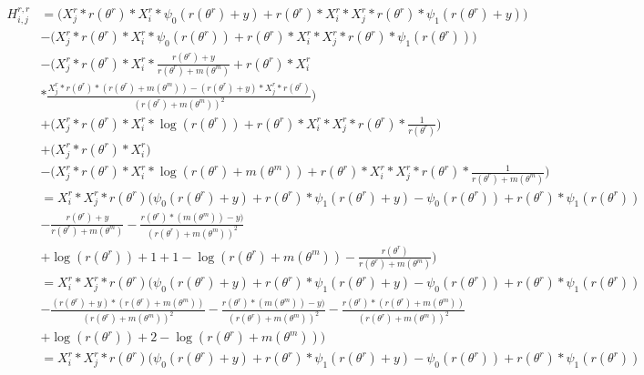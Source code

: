 \documentclass[bibliography=totoc,10pt]{scrartcl}
\begin{document}
\begin{equation}
\begin{split}
H^{r,r}_{i,j} &= \bigg( X^r_{j} * r(\theta^r) * X^r_{i} * \psi_0(r(\theta^r)+y) + r(\theta^r) * X^r_{i} * X^r_{j} * r(\theta^r) * \psi_1(r(\theta^r)+y) \bigg) \\
&- \bigg( X^r_{j} * r(\theta^r) * X^r_{i} * \psi_0(r(\theta^r)) + r(\theta^r) * X^r_{i} * X^r_{j} * r(\theta^r) * \psi_1(r(\theta^r)) \bigg) \\
&- \bigg( X^r_{j} * r(\theta^r) * X^r_{i} * \frac{r(\theta^r) + y}{r(\theta^r)+m(\theta^m)} + r(\theta^r) * X^r_{i} \\
&* \frac{X^r_{j} * r(\theta^r)*(r(\theta^r)+m(\theta^m))-(r(\theta^r) + y)*X^r_{j} * r(\theta^r)}{(r(\theta^r)+m(\theta^m))^2} \bigg) \\
&+\bigg( X^r_{j} * r(\theta^r) * X^r_{i} * \log(r(\theta^r)) + r(\theta^r) * X^r_{i} * X^r_{j} * r(\theta^r) * \frac{1}{r(\theta^r)} \bigg) \\
&+\bigg( X^r_{j} * r(\theta^r) * X^r_{i}  \bigg) \\
&- \bigg( X^r_{j} * r(\theta^r) * X^r_{i} * \log(r(\theta^r)+m(\theta^m)) +  r(\theta^r) * X^r_{i} * X^r_{j} * r(\theta^r) * \frac{1}{r(\theta^r)+m(\theta^m)} \bigg) \\
&=X^r_{i} * X^r_{j} * r(\theta^r) \bigg( \psi_0(r(\theta^r)+y) + r(\theta^r) * \psi_1(r(\theta^r)+y) - \psi_0(r(\theta^r)) + r(\theta^r) * \psi_1(r(\theta^r)) \\
&- \frac{r(\theta^r) + y}{r(\theta^r)+m(\theta^m)} - \frac{ r(\theta^r)*(m(\theta^m)) - y)}{(r(\theta^r)+m(\theta^m))^2} \\
&+ \log(r(\theta^r)) + 1 + 1-  \log(r(\theta^r)+m(\theta^m)) - \frac{r(\theta^r) }{r(\theta^r)+m(\theta^m)} \bigg) \\
&=X^r_{i} * X^r_{j} * r(\theta^r) \bigg( \psi_0(r(\theta^r)+y) + r(\theta^r) * \psi_1(r(\theta^r)+y) - \psi_0(r(\theta^r)) + r(\theta^r) * \psi_1(r(\theta^r)) \\
&- \frac{(r(\theta^r) + y)*(r(\theta^r)+m(\theta^m))}{(r(\theta^r)+m(\theta^m))^2} - \frac{ r(\theta^r)*(m(\theta^m)) - y)}{(r(\theta^r)+m(\theta^m))^2} - \frac{r(\theta^r)*(r(\theta^r)+m(\theta^m))}{(r(\theta^r)+m(\theta^m))^2} \\
&+ \log(r(\theta^r)) + 2-  \log(r(\theta^r)+m(\theta^m)) \bigg) \\
&=X^r_{i} * X^r_{j} * r(\theta^r) \bigg( \psi_0(r(\theta^r)+y) + r(\theta^r) * \psi_1(r(\theta^r)+y) - \psi_0(r(\theta^r)) + r(\theta^r) * \psi_1(r(\theta^r)) \\

\end{split}
\end{equation}
\end{document}
